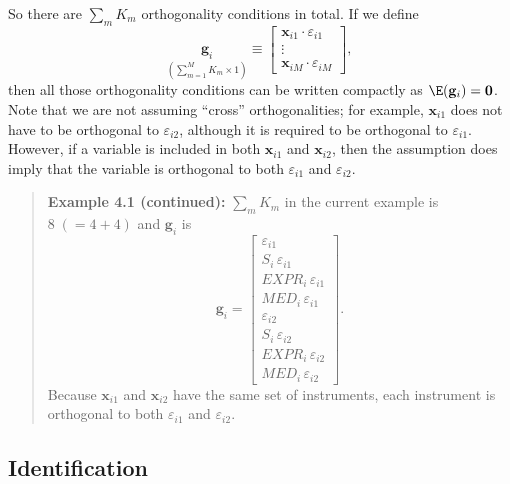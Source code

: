 So there are $\sum_m K_m$ orthogonality conditions in total. If we define
\begin{equation}
\underset{(\sum_{m=1}^{M} K_m \times 1)}{\mathbf{g}_i}
\equiv \begin{bmatrix} \mathbf{x}_{i1} \cdot \varepsilon_{i1} \\ \vdots \\
\mathbf{x}_{iM} \cdot \varepsilon_{iM} \end{bmatrix},
\label{eq:4.1.4}
\end{equation}
then all those orthogonality conditions can be written compactly as
$\E(\mathbf{g}_i) = \mathbf{0}$.
Note that we are not assuming ``cross'' orthogonalities; for example, $\mathbf{x}_{i1}$
does not have to be orthogonal to $\varepsilon_{i2}$, although it is required to be orthogonal
to $\varepsilon_{i1}$. However, if a variable is included in both $\mathbf{x}_{i1}$
and $\mathbf{x}_{i2}$, then the assumption does imply that the variable is orthogonal to
both $\varepsilon_{i1}$ and $\varepsilon_{i2}$.

\begin{quote}
\textbf{Example 4.1 (continued):}\quad
$\sum_m K_m$ in the current example is $8\; (= 4 + 4)$
and $\mathbf{g}_i$ is
\[
\mathbf{g}_i = \begin{bmatrix}
\varepsilon_{i1} \\ S_i\, \varepsilon_{i1} \\ EXPR_i\, \varepsilon_{i1} \\
MED_i\, \varepsilon_{i1} \\
\varepsilon_{i2} \\ S_i\, \varepsilon_{i2} \\ EXPR_i\, \varepsilon_{i2} \\
MED_i\, \varepsilon_{i2}
\end{bmatrix}.
\]
Because $\mathbf{x}_{i1}$ and $\mathbf{x}_{i2}$ have the same set of instruments,
each instrument is orthogonal to both $\varepsilon_{i1}$ and $\varepsilon_{i2}$.
\end{quote}

\subsection*{Identification}

